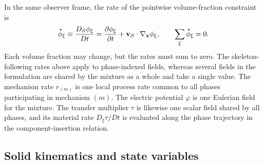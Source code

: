 In the same observer frame, the rate of the pointwise volume-fraction
constraint is
%
\begin{equation}
	\phasedot\phi_\xi
	\equiv
	\frac{D_{\mc S}\phi_\xi}{Dt}
	=
	\frac{\partial\phi_\xi}{\partial t}
	+
	\mbf v_{\mc S}\cdot\nabla_{\mbf x}\phi_\xi,
	\qquad
	\sum_\xi\phasedot\phi_\xi=0 .
	\label{eq:MC_skeleton_volume_fraction_rates}
\end{equation}
%
Each volume fraction may change, but the rates must sum to zero.  The
skeleton-following rates above apply to phase-indexed fields, whereas several
fields in the formulation are shared by the mixture as a whole and take a
single value.  The mechanism rate \(r_{(m)}\) is one local process rate common
to all phases participating in mechanism \((m)\).  The electric potential
\(\varphi\) is one Eulerian field for the mixture.  The transfer multiplier
\(\tau\) is likewise one scalar field shared by all phases, and its material
rate \(D_\xi\tau/Dt\) is evaluated along the phase trajectory in the
component-insertion relation.

\subsection{Solid kinematics and state variables}
\label{sec:MC_solid_kinematics}

